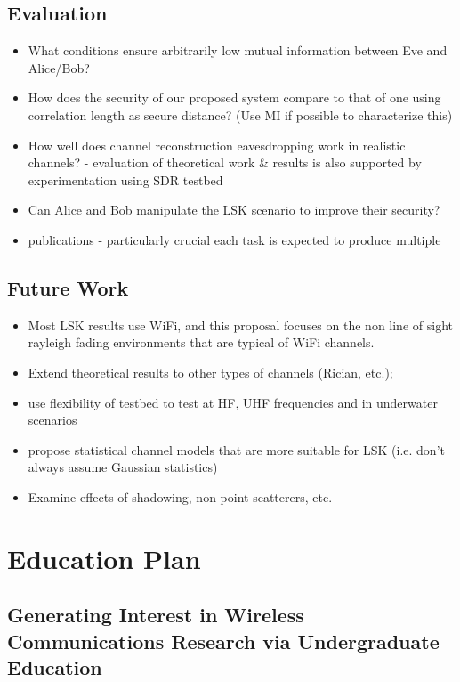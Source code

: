 \documentclass[12pt, titlepage]{article}
\begin{document}
\subsection*{Evaluation}
\begin{itemize}
	\item What conditions ensure arbitrarily low mutual information between Eve and Alice/Bob?
	\item How does the security of our proposed system compare to that of one using correlation length as secure distance?  (Use MI if possible to characterize this)
	\item How well does channel reconstruction eavesdropping work in realistic channels? - evaluation of theoretical work \& results is also supported by experimentation using SDR testbed
	\item Can Alice and Bob manipulate the LSK scenario to improve their security?
	\item publications - particularly crucial each task is expected to produce multiple
\end{itemize}
\subsection*{Future Work}
\begin{itemize}
\item Most LSK results use WiFi, and this proposal focuses on the non line of sight rayleigh fading environments that are typical of WiFi channels. 
\item Extend theoretical results to other types of channels (Rician, etc.); 
\item use flexibility of testbed to test at HF, UHF frequencies and in underwater scenarios
\item propose statistical channel models that are more suitable for LSK (i.e. don't always assume Gaussian statistics)
\item Examine effects of shadowing, non-point scatterers, etc.
\end{itemize}

\section*{Education Plan}
\subsection*{Generating Interest in Wireless Communications Research via Undergraduate Education}
\end{document}
